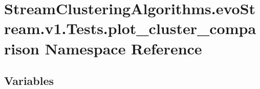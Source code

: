 \hypertarget{namespaceStreamClusteringAlgorithms_1_1evoStream_1_1v1_1_1Tests_1_1plot__cluster__comparison}{}\section{Stream\+Clustering\+Algorithms.\+evo\+Stream.\+v1.\+Tests.\+plot\+\_\+cluster\+\_\+comparison Namespace Reference}
\label{namespaceStreamClusteringAlgorithms_1_1evoStream_1_1v1_1_1Tests_1_1plot__cluster__comparison}
\subsection*{Variables}
